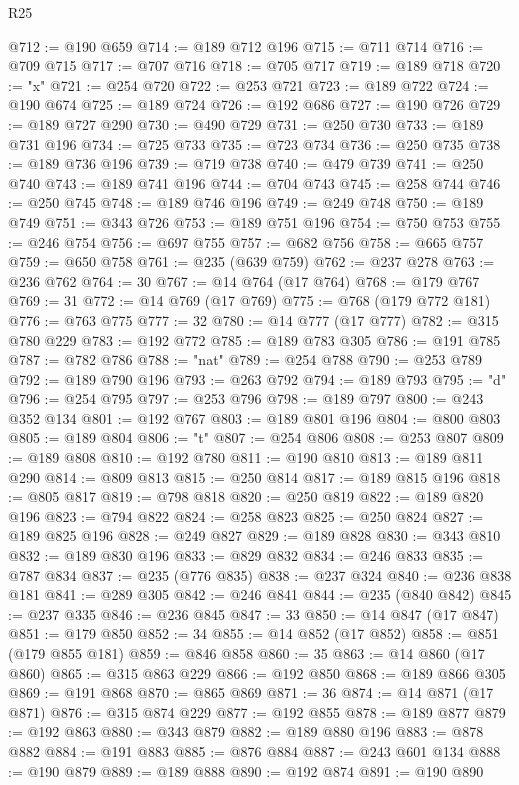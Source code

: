 \begin{lexlean}{R25}
\begin{coremodule}
@712 := @190 @659
@714 := @189 @712 @196
@715 := @711 @714
@716 := @709 @715
@717 := @707 @716
@718 := @705 @717
@719 := @189 @718
@720 := "x"
@721 := @254 @720
@722 := @253 @721
@723 := @189 @722
@724 := @190 @674
@725 := @189 @724
@726 := @192 @686
@727 := @190 @726
@729 := @189 @727 @290
@730 := @490 @729
@731 := @250 @730
@733 := @189 @731 @196
@734 := @725 @733
@735 := @723 @734
@736 := @250 @735
@738 := @189 @736 @196
@739 := @719 @738
@740 := @479 @739
@741 := @250 @740
@743 := @189 @741 @196
@744 := @704 @743
@745 := @258 @744
@746 := @250 @745
@748 := @189 @746 @196
@749 := @249 @748
@750 := @189 @749
@751 := @343 @726
@753 := @189 @751 @196
@754 := @750 @753
@755 := @246 @754
@756 := @697 @755
@757 := @682 @756
@758 := @665 @757
@759 := @650 @758
@761 := @235 (@639 @759)
@762 := @237 @278
@763 := @236 @762
@764 := 30
@767 := @14 @764 (@17 @764)
@768 := @179 @767
@769 := 31
@772 := @14 @769 (@17 @769)
@775 := @768 (@179 @772 @181)
@776 := @763 @775
@777 := 32
@780 := @14 @777 (@17 @777)
@782 := @315 @780 @229
@783 := @192 @772
@785 := @189 @783 @305
@786 := @191 @785
@787 := @782 @786
@788 := "nat"
@789 := @254 @788
@790 := @253 @789
@792 := @189 @790 @196
@793 := @263 @792
@794 := @189 @793
@795 := "d"
@796 := @254 @795
@797 := @253 @796
@798 := @189 @797
@800 := @243 @352 @134
@801 := @192 @767
@803 := @189 @801 @196
@804 := @800 @803
@805 := @189 @804
@806 := "t"
@807 := @254 @806
@808 := @253 @807
@809 := @189 @808
@810 := @192 @780
@811 := @190 @810
@813 := @189 @811 @290
@814 := @809 @813
@815 := @250 @814
@817 := @189 @815 @196
@818 := @805 @817
@819 := @798 @818
@820 := @250 @819
@822 := @189 @820 @196
@823 := @794 @822
@824 := @258 @823
@825 := @250 @824
@827 := @189 @825 @196
@828 := @249 @827
@829 := @189 @828
@830 := @343 @810
@832 := @189 @830 @196
@833 := @829 @832
@834 := @246 @833
@835 := @787 @834
@837 := @235 (@776 @835)
@838 := @237 @324
@840 := @236 @838 @181
@841 := @289 @305
@842 := @246 @841
@844 := @235 (@840 @842)
@845 := @237 @335
@846 := @236 @845
@847 := 33
@850 := @14 @847 (@17 @847)
@851 := @179 @850
@852 := 34
@855 := @14 @852 (@17 @852)
@858 := @851 (@179 @855 @181)
@859 := @846 @858
@860 := 35
@863 := @14 @860 (@17 @860)
@865 := @315 @863 @229
@866 := @192 @850
@868 := @189 @866 @305
@869 := @191 @868
@870 := @865 @869
@871 := 36
@874 := @14 @871 (@17 @871)
@876 := @315 @874 @229
@877 := @192 @855
@878 := @189 @877
@879 := @192 @863
@880 := @343 @879
@882 := @189 @880 @196
@883 := @878 @882
@884 := @191 @883
@885 := @876 @884
@887 := @243 @601 @134
@888 := @190 @879
@889 := @189 @888
@890 := @192 @874
@891 := @190 @890

\end{coremodule}
\end{lexlean}
